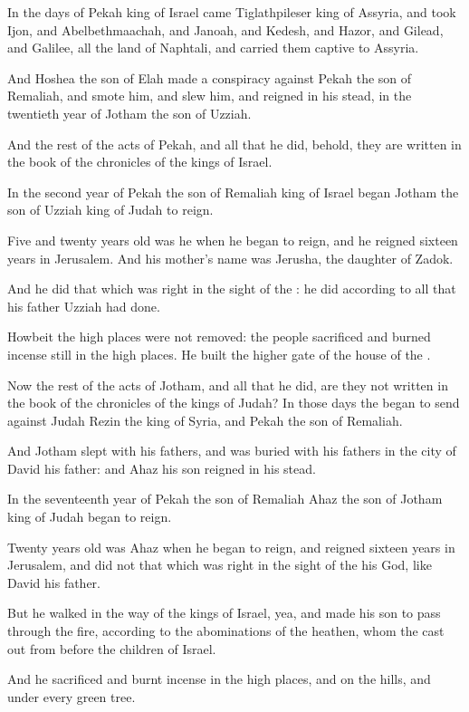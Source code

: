 \Verse In the days of Pekah king of Israel came Tiglathpileser king of Assyria, and took Ijon, and Abelbethmaachah, and Janoah, and Kedesh, and Hazor, and Gilead, and Galilee, all the land of Naphtali, and carried them captive to Assyria.

\Verse And Hoshea the son of Elah made a conspiracy against Pekah the son of Remaliah, and smote him, and slew him, and reigned in his stead, in the twentieth year of Jotham the son of Uzziah.

\Verse And the rest of the acts of Pekah, and all that he did, behold, they are written in the book of the chronicles of the kings of Israel.

\Verse In the second year of Pekah the son of Remaliah king of Israel began Jotham the son of Uzziah king of Judah to reign.

\Verse Five and twenty years old was he when he began to reign, and he reigned sixteen years in Jerusalem. And his mother's name was Jerusha, the daughter of Zadok.

\Verse And he did that which was right in the sight of the \LORD: he did according to all that his father Uzziah had done.

\Verse Howbeit the high places were not removed: the people sacrificed and burned incense still in the high places. He built the higher gate of the house of the \LORD.

\Verse Now the rest of the acts of Jotham, and all that he did, are they not written in the book of the chronicles of the kings of Judah?  \Verse In those days the \LORD began to send against Judah Rezin the king of Syria, and Pekah the son of Remaliah.

\Verse And Jotham slept with his fathers, and was buried with his fathers in the city of David his father: and Ahaz his son reigned in his stead.


\Chapter
\Verse In the seventeenth year of Pekah the son of Remaliah Ahaz the son of Jotham king of Judah began to reign.

\Verse Twenty years old was Ahaz when he began to reign, and reigned sixteen years in Jerusalem, and did not that which was right in the sight of the \LORD his God, like David his father.

\Verse But he walked in the way of the kings of Israel, yea, and made his son to pass through the fire, according to the abominations of the heathen, whom the \LORD cast out from before the children of Israel.

\Verse And he sacrificed and burnt incense in the high places, and on the hills, and under every green tree.

